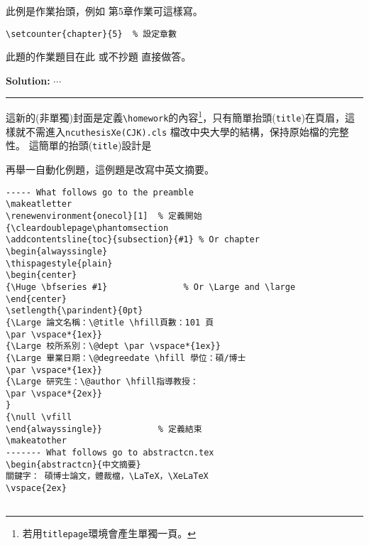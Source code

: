 \begin{appendB}
此例是作業抬頭，例如 第5章作業可這樣寫。

\verb|\setcounter{chapter}{5}  % 設定章數|
\setcounter{chapter}{5}
\begin{pr}
此題的作業題目在此 或不抄題 直接做答。

{\bf Solution:}
$\cdots$
\end{pr}

\rule{\linewidth}{0.5mm} 

這新的(非單獨)封面是定義\verb|\homework|的內容\footnote{若用{\tt titlepage}環境會產生單獨一頁。}，只有簡單抬頭({\tt title})在頁眉，這樣就不需進入{\tt ncuthesisXe(CJK).cls}
檔改中央大學的結構，保持原始檔的完整性。
這簡單的抬頭({\tt title})設計是%


再舉一自動化例題，這例題是改寫中英文摘要。

\begin{Verbatim}[frame=single,firstline=1,lastline=50,rulecolor=\color{red},label=New abstract]
----- What follows go to the preamble
\makeatletter
\renewenvironment{onecol}[1]  % 定義開始
{\cleardoublepage\phantomsection
\addcontentsline{toc}{subsection}{#1} % Or chapter
\begin{alwayssingle}
\thispagestyle{plain}
\begin{center}
{\Huge \bfseries #1}               % Or \Large and \large
\end{center}
\setlength{\parindent}{0pt}
{\Large 論文名稱：\@title \hfill頁數：101 頁
\par \vspace*{1ex}}
{\Large 校所系別：\@dept \par \vspace*{1ex}}
{\Large 畢業日期：\@degreedate \hfill 學位：碩/博士 
\par \vspace*{1ex}}
{\Large 研究生：\@author \hfill指導教授：
\par \vspace*{2ex}}
}
{\null \vfill
\end{alwayssingle}}           % 定義結束
\makeatother
------- What follows go to abstractcn.tex
\begin{abstractcn}{中文摘要}
關鍵字： 碩博士論文，體裁檔，\LaTeX，\XeLaTeX
\vspace{2ex}


\end{Verbatim}
\end{appendB}
